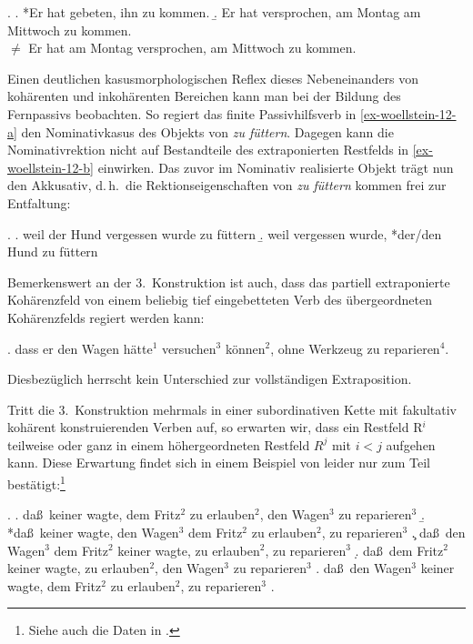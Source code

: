 \ex. \label{ex-3konstr-2}
\a. *Er hat gebeten, ihn zu kommen.
\b. Er hat versprochen, am Montag am Mittwoch zu kommen. \\
$\neq$ Er hat am Montag versprochen, am Mittwoch zu kommen.     

Einen deutlichen kasusmorphologischen Reflex dieses Nebeneinanders von kohärenten und inkohärenten Bereichen kann man bei der Bildung des Fernpassivs beobachten. So regiert das finite Passivhilfsverb in \ref{ex-woellstein-12-a} den Nominativkasus des Objekts von {\it zu füttern}. Dagegen kann die Nominativrektion nicht auf Bestandteile des extraponierten Restfelds in \ref{ex-woellstein-12-b} einwirken. Das zuvor im Nominativ realisierte Objekt trägt nun den Akkusativ, d.\,h.\ die Rektionseigenschaften von {\it zu füttern} kommen frei zur Entfaltung:      

\ex. 
\a. weil der Hund vergessen wurde zu füttern \hspace{2em} \citep[(12c)]{Woellstein:01}\label{ex-woellstein-12-a} 
\b. weil vergessen wurde, *der/den Hund zu füttern \label{ex-woellstein-12-b}
  
Bemerkenswert an der 3.~Konstruktion ist auch, dass das partiell extraponierte Kohärenzfeld von einem beliebig tief eingebetteten Verb des übergeordneten Kohärenzfelds regiert werden kann:

\ex. dass er den Wagen hätte$^1$ versuchen$^3$ können$^2$, ohne Werkzeug zu repa\-rie\-ren$^4$.

Diesbezüglich herrscht kein Unterschied zur vollständigen Extraposition.

Tritt die 3.~Konstruktion mehrmals in einer subordinativen Kette mit fakultativ kohärent konstruierenden Verben auf, so erwarten wir, dass ein Restfeld R$^i$ teilweise oder ganz in einem höhergeordneten Restfeld $R^j$ mit $i<j$ aufgehen kann. Diese Erwartung findet sich in einem Beispiel von \cite{Sabel:95} leider nur zum Teil bestätigt:\footnote{Siehe auch die Daten in \citet[18]{Rambow:94}.}

{\setlength{\Exlabelsep}{0.8em} \setlength{\SubExleftmargin}{1.7em}
\ex.
\a. da\ss\ keiner wagte, dem Fritz$^2$ zu erlauben$^2$, den Wagen$^3$ zu reparie\-ren$^3$
\b. *da\ss\ keiner wagte, den Wagen$^3$ dem Fritz$^2$ zu erlauben$^2$, zu reparie\-ren$^3$\label{ex-sabel-28-b}
\c. da\ss\ den Wagen$^3$ dem Fritz$^2$ keiner wagte, zu erlauben$^2$, zu reparie\-ren$^3$
\d. da\ss\ dem Fritz$^2$ keiner wagte, zu erlauben$^2$, den Wagen$^3$ zu reparie\-ren$^3$
\e. da\ss\ den Wagen$^3$ keiner wagte, dem Fritz$^2$ zu erlauben$^2$, zu reparie\-ren$^3$
\z. \citep[(28)]{Sabel:95}

}

